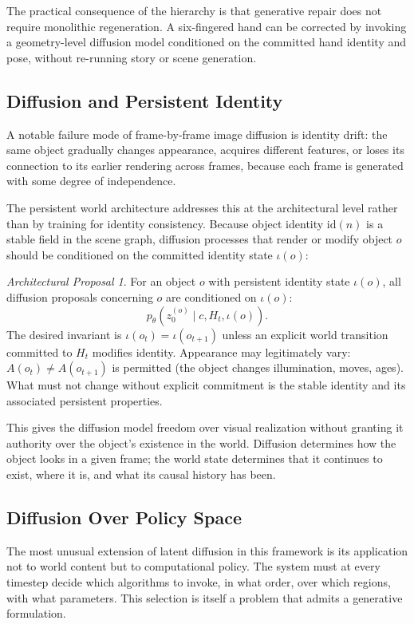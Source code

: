 \documentclass[12pt,a4paper]{article}
\theoremstyle{plain}
\theoremstyle{definition}
\theoremstyle{remark}
\newtheorem{proposal}[theorem]{Architectural Proposal}
\begin{document}
The practical consequence of the hierarchy is that generative repair does not require monolithic regeneration. A six-fingered hand can be corrected by invoking a geometry-level diffusion model conditioned on the committed hand identity and pose, without re-running story or scene generation.

\subsection{Diffusion and Persistent Identity}

A notable failure mode of frame-by-frame image diffusion is identity drift: the same object gradually changes appearance, acquires different features, or loses its connection to its earlier rendering across frames, because each frame is generated with some degree of independence.

The persistent world architecture addresses this at the architectural level rather than by training for identity consistency. Because object identity $\mathrm{id}(n)$ is a stable field in the scene graph, diffusion processes that render or modify object $o$ should be conditioned on the committed identity state $\iota(o)$:

\begin{proposal}
For an object $o$ with persistent identity state $\iota(o)$, all diffusion proposals concerning $o$ are conditioned on $\iota(o)$:
\[
p_\theta(z_0^{(o)} \mid c, H_t, \iota(o)).
\]
The desired invariant is $\iota(o_t) = \iota(o_{t+1})$ unless an explicit world transition committed to $H_t$ modifies identity. Appearance may legitimately vary: $A(o_t) \neq A(o_{t+1})$ is permitted (the object changes illumination, moves, ages). What must not change without explicit commitment is the stable identity and its associated persistent properties.
\end{proposal}

This gives the diffusion model freedom over visual realization without granting it authority over the object's existence in the world. Diffusion determines how the object looks in a given frame; the world state determines that it continues to exist, where it is, and what its causal history has been.

\subsection{Diffusion Over Policy Space}

The most unusual extension of latent diffusion in this framework is its application not to world content but to computational policy. The system must at every timestep decide which algorithms to invoke, in what order, over which regions, with what parameters. This selection is itself a problem that admits a generative formulation.
\end{document}
